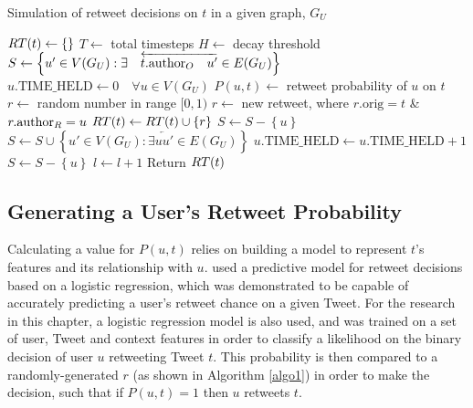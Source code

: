 \begin{algorithm}
\caption{Simulation of retweet decisions on $t$ in a given graph, $G_U$}
\begin{algorithmic}[1]
    \State $RT(t)\gets \left\{\right\}$
    \State $T\gets$ total timesteps
    \State $H\gets$ decay threshold 
    \State $S\gets \left\{u' \in V(G_U) : \exists \quad \overleftarrow{t.\textrm{author}_O \quad u'} \in E(G_U)\right\}$
    \State $u.\textrm{TIME\_HELD}\gets 0 \quad \forall u \in V(G_U)$
    \Statex %
            \State $P(u,t)\gets$ retweet probability of $u$ on $t$
            \State $r\gets$ random number in range $[0,1)$
                \State $r\gets$ new retweet, where $r.\textrm{orig} = t$ \& $r.\textrm{author}_R = u$
                \State $RT(t)\gets RT(t) \cup \left\{r\right\}$
                \State $S\gets S - \left\{u\right\}$
                \State $S\gets S \cup \left\{u' \in V(G_U) : \exists \overleftarrow{u u'} \in E(G_U)\right\}$
            \Else
                \State $u.\textrm{TIME\_HELD}\gets u.\textrm{TIME\_HELD} + 1$
                    \State $S\gets S - \left\{u\right\}$ 
                \EndIf
            \EndIf
        \EndFor
        \State $l\gets l + 1$
    \EndWhile
    \State Return $RT(t)$
\EndProcedure
\end{algorithmic}
\label{algo1}
\end{algorithm}


\subsection{Generating a User's Retweet Probability} 
Calculating a value for $P(u,t)$ relies on building a model to represent $t$'s features and its relationship with $u$. \citet{zhu11} used a predictive model for retweet decisions based on a logistic regression, which was demonstrated to be capable of accurately predicting a user's retweet chance on a given Tweet. For the research in this chapter, a logistic regression model is also used, and was trained on a set of user, Tweet and context features in order to classify a likelihood on the binary decision of user $u$ retweeting Tweet $t$. This probability is then compared to a randomly-generated $r$ (as shown in Algorithm \ref{algo1}) in order to make the decision, such that if $P(u,t) = 1$ then $u$ retweets $t$. 


